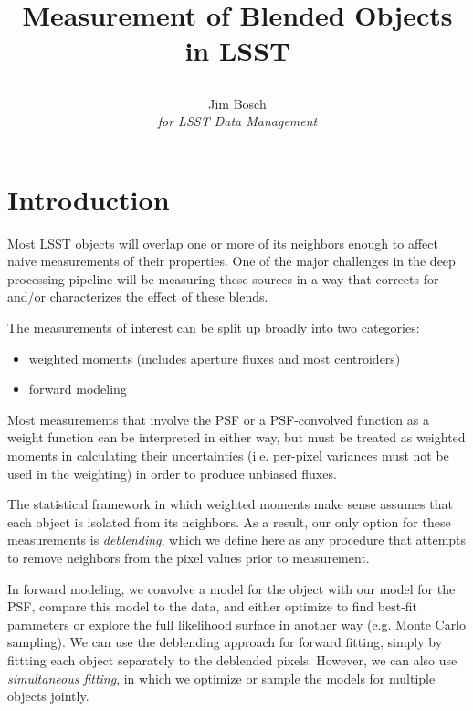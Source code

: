 \documentclass[10pt]{article}
\title{Measurement of Blended Objects in LSST\\
{\author{
    Jim Bosch\\
    {\em for LSST Data Management}
}}}
\begin{document}
\maketitle

\section{Introduction}

Most LSST objects will overlap one or more of its neighbors enough to affect
naive measurements of their properties.  One of the major challenges in the
deep processing pipeline will be measuring these sources in a way that
corrects for and/or characterizes the effect of these blends.

The measurements of interest can be split up broadly into two categories:
\begin{itemize}
    \item weighted moments (includes aperture fluxes and most centroiders)
    \item forward modeling
\end{itemize}

Most measurements that involve the PSF or a PSF-convolved function as a weight
function can be interpreted in either way, but must be treated as weighted
moments in calculating their uncertainties (i.e. per-pixel variances must
not be used in the weighting) in order to produce unbiased fluxes.

The statistical framework in which weighted moments make sense assumes that
each object is isolated from its neighbors.  As a result, our only option for
these measurements is {\em deblending}, which we define here as any
procedure that attempts to remove neighbors from the pixel values prior to
measurement.

In forward modeling, we convolve a model for the object with our model for
the PSF, compare this model to the data, and either optimize to find
best-fit parameters or explore the full likelihood surface in another way
(e.g. Monte Carlo sampling).  We can use the deblending approach for
forward fitting, simply by fittting each object separately to the deblended
pixels.  However, we can also use {\em simultaneous fitting}, in which we
optimize or sample the models for multiple objects jointly.
\end{document}
